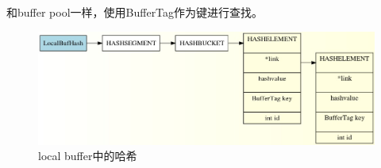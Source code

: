 \documentclass{article}
\begin{document}
\begin{CJK*}{UTF8}{gkai}
和buffer pool一样，使用BufferTag作为键进行查找。
\begin{figure}[H] 
\centering
\includegraphics[width = \textwidth]{local.jpg}
\caption{local buffer中的哈希}
\label{overflow}
\end{figure}

\begin{table}[H] 


\end{table}
\end{CJK*}
\end{document}
